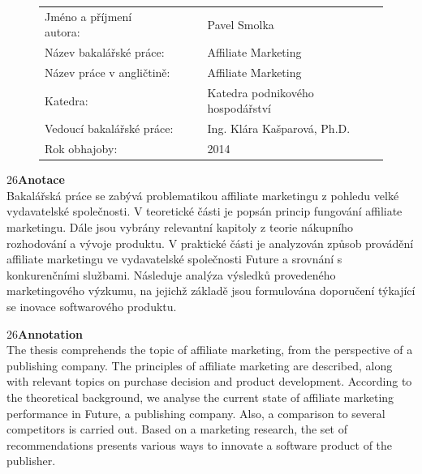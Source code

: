\documentclass[12pt,oneside,openany]{fithesis}
\begin{document}

\FrontMatter %
\ThesisTitlePage %
\clearpage          




     \begin{figure}[h!]	
\begin{tabular}{l l }\vspace{1mm}
Jméno a příjmení autora:~~~~~	& Pavel Smolka	\\ \vspace{1mm}
Název bakalářské práce:	&	Affiliate Marketing\\ \vspace{1mm}
Název práce v angličtině:	&	Affiliate Marketing\\ \vspace{1mm}
Katedra:	&   Katedra podnikového hospodářství	\\ \vspace{1mm}
Vedoucí bakalářské práce:	&	Ing. Klára Kašparová, Ph.D.	\\ \vspace{1mm}
Rok obhajoby:	&	2014 \\
\end{tabular}
\end{figure}

\vspace{10mm}

\fontsize{18} {26}\textbf{Anotace}
\vspace{3mm} 
\\Bakalářská práce se zabývá problematikou affiliate marketingu z
pohledu velké vydavatelské společnosti. V teoretické části je
popsán princip fungování affiliate marketingu. Dále jsou
vybrány relevantní kapitoly z teorie nákupního rozhodování a
vývoje produktu. V praktické části je analyzován způsob
provádění affiliate marketingu ve vydavatelské společnosti
Future a srovnání s konkurenčními službami. Následuje analýza
výsledků provedeného marketingového výzkumu, na jejichž základě
jsou formulována doporučení týkající se inovace softwarového
produktu.
                                                            
\vspace{5mm}
\fontsize{18} {26}\textbf{Annotation}
\vspace{3mm}
\\The thesis comprehends the topic of affiliate marketing, from
the perspective of a publishing company. The principles of
affiliate marketing are described, along with relevant topics
on purchase decision and product development. According to the
theoretical background, we analyse the current state of
affiliate marketing performance in Future, a publishing
company. Also, a comparison to several competitors is carried
out. Based on a marketing research, the set of recommendations
presents various ways to innovate a software product of the
publisher.
\end{document}
